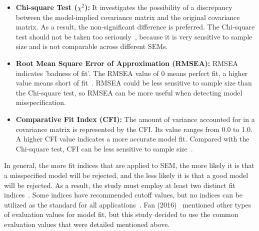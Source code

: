 \begin{itemize}
\item \textbf{Chi-square Test ($\chi^2$):} It investigates the possibility of a discrepancy between the model-implied covariance matrix and the original covariance matrix. As a result, the non-significant difference is preferred. The Chi-square test should not be taken too seriously~\cite{ref22,ref23,ref24}, because it is very sensitive to sample size and is not comparable across different SEMs.
\item \textbf{Root Mean Square Error of Approximation (RMSEA):} RMSEA indicates 'badness of fit'. The RMSEA value of 0 means perfect fit, a higher value means short of fit~\cite{ref25}. RMSEA could be less sensitive to sample size than the Chi-square test, so RMSEA can be more useful when detecting model misspecification.
\item \textbf{Comparative Fit Index (CFI):} The amount of variance accounted for in a covariance matrix is represented by the CFI. Its value ranges from 0.0 to 1.0. A higher CFI value indicates a more accurate model fit. Compared with the Chi-square test, CFI can be less sensitive to sample size~\cite{ref26}.
\end{itemize}

In general, the more fit indices that are applied to SEM, the more likely it is that a misspecified model will be rejected, and the less likely it is that a good model will be rejected. As a result, the study must employ at least two distinct fit indices~\cite{ref17}. Some indices have recommended cutoff values, but no indices can be utilized as the standard for all applications~\cite{ref18,ref19,ref20,ref21}. Fan (2016)~\cite{ref16} mentioned other types of evaluation values for model fit, but this study decided to use the common evaluation values that were detailed mentioned above. 

